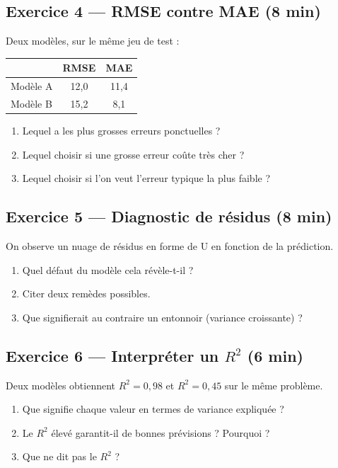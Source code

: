 \subsection*{Exercice 4 --- RMSE contre MAE \hfill \normalfont\footnotesize (8 min)}
Deux modèles, sur le même jeu de test :
\begin{center}
\small
\begin{tabular}{@{}lcc@{}}
\toprule
& \textbf{RMSE} & \textbf{MAE} \\
\midrule
Modèle A & 12,0 & 11,4 \\
Modèle B & 15,2 & 8,1 \\
\bottomrule
\end{tabular}
\end{center}
\begin{enumerate}
  \item Lequel a les plus grosses erreurs ponctuelles ?
  \item Lequel choisir si une grosse erreur coûte très cher ?
  \item Lequel choisir si l'on veut l'erreur typique la plus faible ?
\end{enumerate}

\subsection*{Exercice 5 --- Diagnostic de résidus \hfill \normalfont\footnotesize (8 min)}
On observe un nuage de résidus en forme de U en fonction de la prédiction.
\begin{enumerate}
  \item Quel défaut du modèle cela révèle-t-il ?
  \item Citer deux remèdes possibles.
  \item Que signifierait au contraire un entonnoir (variance croissante) ?
\end{enumerate}


\subsection*{Exercice 6 --- Interpréter un $R^2$ \hfill \normalfont\footnotesize (6 min)}
Deux modèles obtiennent $R^2=0{,}98$ et $R^2=0{,}45$ sur le même problème.
\begin{enumerate}
  \item Que signifie chaque valeur en termes de variance expliquée ?
  \item Le $R^2$ élevé garantit-il de bonnes prévisions ? Pourquoi ?
  \item Que ne dit pas le $R^2$ ?
\end{enumerate}

